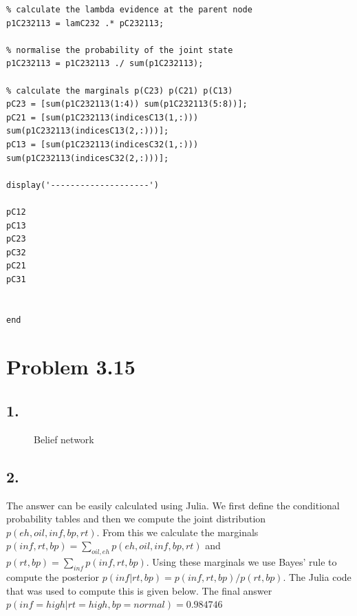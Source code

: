 \documentclass[11pt,a4paper,oneside]{report}
\begin{document}
\begin{lstlisting}
% calculate the lambda evidence at the parent node
p1C232113 = lamC232 .* pC232113;

% normalise the probability of the joint state
p1C232113 = p1C232113 ./ sum(p1C232113);
     
% calculate the marginals p(C23) p(C21) p(C13)
pC23 = [sum(p1C232113(1:4)) sum(p1C232113(5:8))];
pC21 = [sum(p1C232113(indicesC13(1,:))) sum(p1C232113(indicesC13(2,:)))];
pC13 = [sum(p1C232113(indicesC32(1,:))) sum(p1C232113(indicesC32(2,:)))];

display('--------------------')

pC12
pC13
pC23
pC32
pC21
pC31

        
end
\end{lstlisting}

\section*{Problem 3.15}

\subsection*{1.}
\begin{figure}[H]
  \centering
    \caption{Belief network}
    \label{fig:all_trade_cca_black}     
\end{figure}


\subsection*{2.}

The answer can be easily calculated using Julia. We first define the 
conditional probability tables and then we compute the joint distribution 
$p(eh, oil, inf, bp, rt)$. From this we calculate the marginals $p(inf,rt,bp) 
= \sum_{oil, eh}p(eh, oil, inf, bp, rt)$ and $p(rt,bp) = 
\sum_{inf}p(inf, rt, bp)$. Using these marginals we use Bayes' rule to compute 
the posterior $p(inf|rt, bp) = p(inf, rt, bp)/p(rt, bp)$. The Julia code that 
was used to compute this is given below. The final answer $p(inf = high | rt 
= high, bp = normal) = 0.984746 $\\
\end{document}
